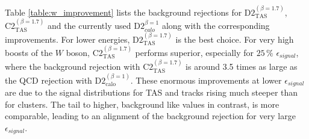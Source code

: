 Table \ref{table:w_improvement} lists the background rejections for $\text{D2}_{\text{TAS}}^{(\beta=1.7)}$, $\text{C2}_{\text{TAS}}^{(\beta=1.7)}$ and the currently used $\text{D2}^{\beta=1}_{calo}$ along with the corresponding improvements. For lower energies, $\text{D2}_{\text{TAS}}^{(\beta=1.7)}$ is the best choice. For very high boosts of the $W$ boson, $\text{C2}_{\text{TAS}}^{(\beta=1.7)}$ performs superior, especially for $25\,\%$ $\epsilon_{signal}$, where the background rejection with $\text{C2}_{\text{TAS}}^{(\beta=1.7)}$ is around 3.5 times as large as the QCD rejection with $\text{D2}^{(\beta=1)}_{\text{calo}}$.
These enormous improvements at lower $\epsilon_{signal}$ are due to the signal distributions for TAS and tracks rising much steeper than for clusters. The tail to higher, background like values in contrast, is more comparable, leading to an alignment of the background rejection for very large $\epsilon_{signal}$.
